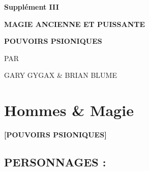 \newpage
{}\begin{center}
{\Huge {}}{\normalsize \textsuperscript{\sffamily\textregistered}}

\vspace{1.8cm}

{\Large \textbf{Supplément III}}

\vspace{1.3cm}

{\Huge {}}

\vspace{0.3cm}

{\Huge {}}

\vspace{2.0cm}

{\Large \textbf{MAGIE ANCIENNE ET PUISSANTE}}

\vspace{0.5cm}

{\Large \textbf{POUVOIRS PSIONIQUES}}

\vspace{1cm}

{\large PAR

\vspace{0.1cm}

GARY GYGAX \& BRIAN BLUME}
\end{center}

\newpage
\phantom{-}
\newpage
\section*{Hommes \& Magie}

\begin{center}
\textbf{[POUVOIRS PSIONIQUES]}
\end{center}

\subsection*{\normalsize PERSONNAGES :}

